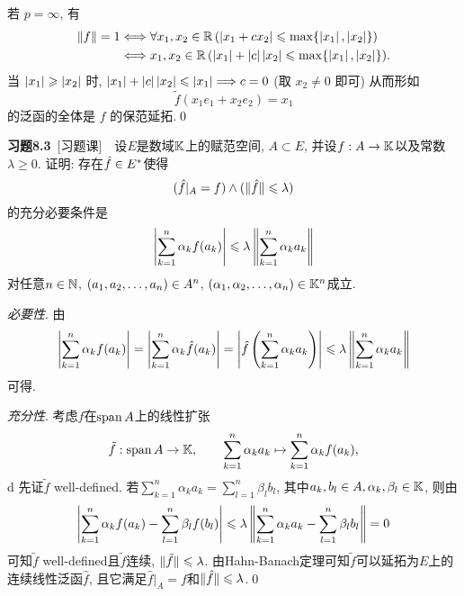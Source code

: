 \begin{Proof}
        若 $ p=\infty $, 有
        \[
            \begin{aligned}
                \lVert f\rVert=1& \Longleftrightarrow \forall x_{1}, x_{2}\in\mathbb{R}\,(\left| x_{1}+cx_{2} \right|  \leqslant\max\{ \left| x_{1} \right| , \left| x_{2} \right|  \})\\
                & \Longleftrightarrow x_{1}, x_{2}\in\mathbb{R}\,(\left| x_{1} \right| +\left| c \right| \left| x_{2} \right| \leqslant\max\{ \left| x_{1} \right| , \left| x_{2} \right|  \}).
            \end{aligned}
        \]
        当 $ \left| x_{1} \right| \geqslant\left| x_{2} \right|  $ 时, $ \left| x_{1} \right| +\left| c \right| \left| x_{2} \right| \leqslant\left| x_{1} \right| \Longrightarrow c=0 $ (取 $ x_{2}\ne 0 $ 即可) 从而形如
        \[
            \tilde{f}(x_{1}e_{1}+x_{2}e_{2})=x_{1}
        \]
        的泛函的全体是 $ f $ 的保范延拓.\qed
    \end{Proof}

    \textbf{习题8.3}\ [习题课]\ \ 设$ E $是数域$ \mathbb{K} $上的赋范空间, $ A\subset E $, 并设$ f : A\to\mathbb{K} $以及常数$ \lambda\geqslant 0 $. 证明: 存在$ \hat{f}\in E^{*} $使得
    \[
    (\hat{f}\rvert_A=f)\land (\lVert \hat{f}\rVert\leqslant\lambda)
    \]
    的充分必要条件是
    \[
    \left| \sum_{k=1}^n\alpha_kf(a_k) \right| \leqslant\lambda\left\| \sum_{k=1}^n\alpha_ka_k \right\|
    \]
    对任意$ n\in\mathbb{N} $, $ (a_{1}, a_{2}, \dots, a_{n})\in A^n $, $ (\alpha_{1}, \alpha_{2}, \dots, \alpha_{n})\in\mathbb{K}^n $成立.
    \begin{Proof}
    \textsl{必要性}. 由
    \[
    \left| \sum_{k=1}^n\alpha_kf(a_k) \right| =\left| \sum_{k=1}^n\alpha_k\hat{f}(a_k) \right| =\left| \hat{f}\left( \sum_{k=1}^n\alpha_ka_k \right) \right| \leqslant\lambda\left\| \sum_{k=1}^n\alpha_ka_k \right\|
    \]
    可得.

    \textsl{充分性}. 考虑$ f $在$ \operatorname{span} A $上的线性扩张
    \[
    \tilde{f} : \operatorname{span} A\to\mathbb{K},\qquad \sum_{k=1}^n\alpha_ka_k\mapsto\sum_{k=1}^n\alpha_kf(a_k),
    \]d
    先证$ \tilde{f} $ well-defined. 若$ \sum\limits_{k=1}^n\alpha_ka_k=\sum\limits_{l=1}^n\beta_lb_l $, 其中$ a_k, b_l\in A, \alpha_{k}, \beta_{l}\in\mathbb{K} $, 则由
    \[
    \left| \sum_{k=1}^n\alpha_kf(a_k)-\sum_{l=1}^n\beta_lf(b_l) \right| \leqslant\lambda\left\| \sum_{k=1}^n\alpha_ka_k-\sum_{l=1}^n\beta_lb_l \right\|=0
    \]
    可知$ \tilde{f} $ well-defined且$ \tilde{f} $连续, $ \lVert \tilde{f}\rVert\leqslant\lambda $. 由Hahn-Banach定理可知$ \tilde{f} $可以延拓为$ E $上的连续线性泛函$ \hat{f} $, 且它满足$ \hat{f}\rvert_A=f $和$ \lVert \hat{f}\rVert\leqslant\lambda $.\qed
    \end{Proof}

